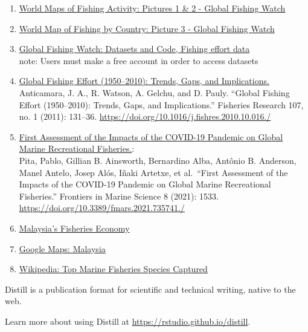 \documentclass[
]{article}
\providecommand{\tightlist}{%
  \setlength{\itemsep}{0pt}\setlength{\parskip}{0pt}}
\begin{document}
\begin{enumerate}
\def\labelenumi{\arabic{enumi}.}
\tightlist
\item
  \href{https://globalfishingwatch.org/map/?latitude=19\&longitude=-30\&zoom=1.5\&start=2021-08-26T23\%3A00\%3A00.000Z\&end=2021-11-27T00\%3A00\%3A00.000Z}{World
  Maps of Fishing Activity: Pictures 1 \& 2 - Global Fishing Watch}\\
\item
  \href{https://globalfishingwatch.org/carrier-portal/?latitude=12.7069821\&longitude=19.1776829\&zoom=1.1903704\&layer\%5B0\%5D=encounter\&layer\%5B1\%5D=cp_rfmo\&layer\%5B2\%5D=cp_next_port\&dataset=carriers:v20211001\&tab=flags}{World
  Map of Fishing by Country: Picture 3 - Global Fishing Watch}\\
\item
  \href{https://globalfishingwatch.org/data-download/datasets/public-fishing-effort}{Global
  Fishing Watch: Datasets and Code, Fishing effort data}\\
  note: Users must make a free account in order to access datasets\\
\item
  \href{https://www.sciencedirect.com/science/article/pii/S0165783610002754?casa_token=o12VmHrPGdkAAAAA:Y0YdOekq7DtNi7wVL0WNShArvCUl6x_S5yURGiEVKNe95eaYAM9y4GP-uqr1bl1bp71A8rNgWj4}{Global
  Fishing Effort (1950--2010): Trends, Gaps, and Implications.}\\
  Anticamara, J. A., R. Watson, A. Gelchu, and D. Pauly. ``Global
  Fishing Effort (1950--2010): Trends, Gaps, and Implications.''
  Fisheries Research 107, no. 1 (2011): 131--36.
  \url{https://doi.org/10.1016/j.fishres.2010.10.016./}
\item
  \href{https://www.frontiersin.org/articles/10.3389/fmars.2021.735741/full}{First
  Assessment of the Impacts of the COVID-19 Pandemic on Global Marine
  Recreational Fisheries.}:\\
  Pita, Pablo, Gillian B. Ainsworth, Bernardino Alba, Antônio B.
  Anderson, Manel Antelo, Josep Alós, Iñaki Artetxe, et al.~``First
  Assessment of the Impacts of the COVID-19 Pandemic on Global Marine
  Recreational Fisheries.'' Frontiers in Marine Science 8 (2021): 1533.
  \url{https://doi.org/10.3389/fmars.2021.735741./}
\item
  \href{http://www.seafdec.org/fisheries-country-profile-malaysia/\#:~:text=Fish\%20trade\%20is\%20valued\%20at,56.8\%20kg\%2Fperson\%2Fyear.\&text=Marine\%20capture\%20fisheries\%20is\%20the,providing\%20work\%20to\%20132\%2C305\%20people.}{Malaysia's
  Fisheries Economy}\\
\item
  \href{https://www.google.com/maps/place/Malaysia/@4.1279224,105.1196274,6z/data=!3m1!4b1!4m5!3m4!1s0x3034d3975f6730af:0x745969328211cd8!8m2!3d4.210484!4d101.975766}{Google
  Maps: Malaysia}\\
\item
  \href{https://en.wikipedia.org/wiki/Ocean_fisheries\#:~:text=The\%20ocean\%20has\%20some\%20of,hake\%2C\%20herring\%2C\%20and\%20mackerel.}{Wikipedia:
  Top Marine Fisheries Species Captured}
\end{enumerate}

Distill is a publication format for scientific and technical writing,
native to the web.

Learn more about using Distill at
\url{https://rstudio.github.io/distill}.
\end{document}
